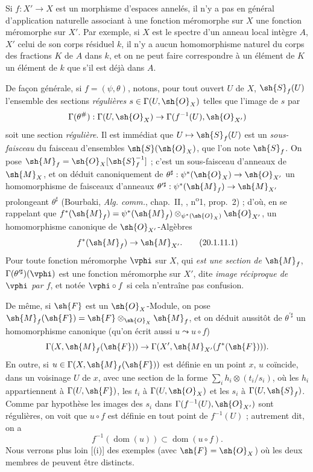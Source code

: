 \begin{env}[20.1.11]
Si $f:X'\to X$ est un morphisme d'espaces annelés, il n'y a pas en général d'application naturelle associant à une fonction méromorphe sur $X$ une fonction méromorphe sur $X'$.
Par exemple, si $X$ est le spectre d'un anneau local intègre $A$, $X'$ celui de son corps résiduel $k$, il n'y a aucun homomorphisme naturel du corps des fractions $K$ de $A$ dans $k$, et on ne peut faire correspondre à un élément de $K$ un élément de $k$ que s'il est déjà dans $A$.

De façon générale, si $f=(\psi,\theta)$, notons, pour tout ouvert $U$ de $X$, $\sh{S}_f(U)$ l'ensemble des sections \emph{régulières} $s\in\Gamma(U,\sh{O}_X)$ telles que l'image de $s$ par
\[
  \Gamma(\theta^\#):\Gamma(U,\sh{O}_X)\to\Gamma(f^{-1}(U),\sh{O}_{X'})
\]
soit une section \emph{régulière}.
Il est immédiat que $U\mapsto\sh{S}_f(U)$ est un \emph{sous-faisceau} du faisceau d'ensembles $\sh{S}(\sh{O}_X)$, que l'on note $\sh{S}_f$.
On pose $\sh{M}_f=\sh{O}_X[\sh{S}_f^{-1}]$ ; c'est un sous-faisceau
d'anneaux de $\sh{M}_X$, et on déduit canoniquement de $\theta^\sharp:\psi^*(\sh{O}_X)\to\sh{O}_{X'}$ un homomorphisme de faisceaux d'anneaux $\theta^{\prime\sharp}:\psi^*(\sh{M}_f)\to\sh{M}_{X'}$ prolongeant $\theta^\sharp$ (Bourbaki, \emph{Alg. comm.}, chap.~II, , n\textsuperscript{o}1, prop.~2) ; d'où, en se rappelant que $f^*(\sh{M}_f)=\psi^*(\sh{M}_f)\otimes_{\psi^*(\sh{O}_X)}\sh{O}_{X'}$, un homomorphisme canonique de $\sh{O}_{X'}$-Algèbres
\[
\label{IV.20.1.11.1}
  f^*(\sh{M}_f)\to\sh{M}_{X'}.
  \tag{20.1.11.1}
\]
Pour toute fonction méromorphe $\vphi$ sur $X$, qui \emph{est une section de $\sh{M}_f$}, $\Gamma(\theta^{\prime\sharp})(\vphi)$ est une fonction méromorphe sur $X'$, dite \emph{image réciproque de $\vphi$ par $f$}, et notée $\vphi\circ f$ si cela n'entraîne pas confusion.

De même, si $\sh{F}$ est un $\sh{O}_X$-Module, on pose $\sh{M}_f(\sh{F})=\sh{F}\otimes_{\sh{O}_X}\sh{M}_f$, et on déduit aussitôt de $\theta^{\prime\sharp}$ un homomorphisme canonique (qu'on écrit aussi $u\leadsto u\circ f$)
\[
  \Gamma(X,\sh{M}_f(\sh{F}))\to\Gamma(X',\sh{M}_{X'}(f^*(\sh{F}))).
\]
En outre, si $u\in\Gamma(X,\sh{M}_f(\sh{F}))$ est définie  en un point $x$, $u$ coïncide, dans un voisinage $U$ de $x$, avec une section de la forme $\sum_i h_i\otimes(t_i/s_i)$, où les $h_i$ appartiennent à $\Gamma(U,\sh{F})$, les $t_i$ à $\Gamma(U,\sh{O}_X)$ et les $s_i$ à $\Gamma(U,\sh{S}_f)$.
Comme par hypothèse les images des $s_i$ dans $\Gamma(f^{-1}(U),\sh{O}_{X'})$ sont régulières, on voit que $u\circ f$ est définie en tout point de $f^{-1}(U)$ ; autrement dit, on a
\[
\label{IV.20.1.11.2}
  f^{-1}(\operatorname{dom}(u))\subset\operatorname{dom}(u\circ f).
  \tag{20.1.11.2}
\]
Nous verrons plus loin [(i)] des exemples (avec $\sh{F}=\sh{O}_X$) où les deux membres de  peuvent être distincts.


\end{env}
